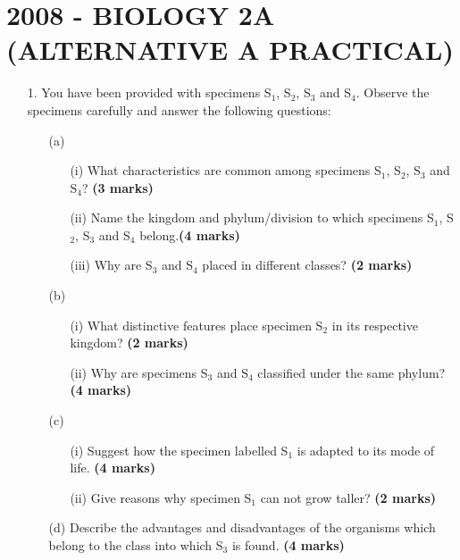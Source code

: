 \section{2008 - BIOLOGY 2A (ALTERNATIVE A PRACTICAL)}

\begin{enumerate}
\item[1.] You have been provided with specimens S$_1$, S$_2$, S$_3$ and S$_4$. Observe the specimens carefully and answer the following questions:
\begin{enumerate}
\item[(a)]
\begin{enumerate}
\item[(i)] What characteristics are common among specimens S$_1$, S$_2$, S$_3$ and S$_4$? \hfill \textbf{(3 marks)}
\item[(ii)] Name the kingdom and phylum/division to which specimens S$_1$, S$_2$, S$_3$ and S$_4$ belong.\flushright \textbf{(4 marks)}\\
\item[(iii)] Why are S$_3$ and S$_4$ placed in different classes? \hfill \textbf{(2 marks)}
\end{enumerate}
\item[(b)]
\begin{enumerate}
\item[(i)] What distinctive features place specimen S$_2$ in its respective kingdom? \hfill \textbf{(2 marks)}
\item[(ii)] Why are specimens S$_3$ and S$_4$ classified under the same phylum? \hfill \textbf{(4 marks)}
\end{enumerate}
\item[(c)]
\begin{enumerate}
\item[(i)] Suggest how the specimen labelled S$_1$ is adapted to its mode of life. \hfill \textbf{(4 marks)}
\item[(ii)] Give reasons why specimen S$_1$ can not grow taller? \hfill \textbf{(2 marks)}
\end{enumerate}
\item[(d)] Describe the advantages and disadvantages of the organisms which belong to the class into which S$_3$ is found. \hfill \textbf{(4 marks)} \\
\end{enumerate}


\end{enumerate}
